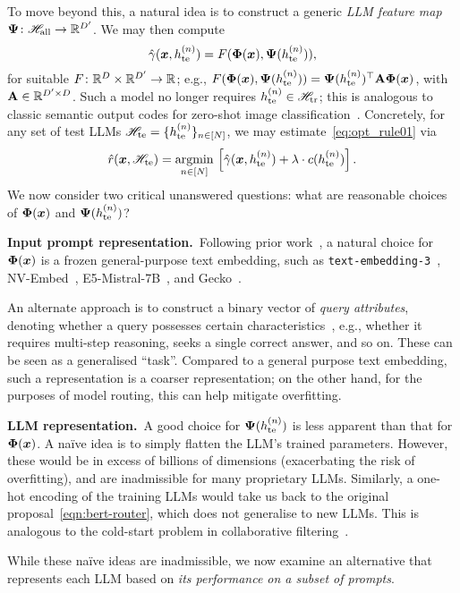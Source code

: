 To move beyond this, a natural idea is to 
construct a generic \emph{LLM feature map}
$\boldsymbol{\Psi} \colon \mathscr{H}_{\rm all} \to \mathbb{R}^{D'}$.
We may then compute
$$ \hat{\gamma}( \boldsymbol{x}, h_{\mathrm{te}}^{( n )} ) = F( \boldsymbol{\Phi}( \boldsymbol{x} ), \boldsymbol{\Psi}( h_{\mathrm{te}}^{( n )} ) ), $$
for suitable $F \colon \mathbb{R}^{D} \times \mathbb{R}^{D'} \to \mathbb{R}$;
e.g.,
$F( \boldsymbol{\Phi}( \boldsymbol{x} ), \boldsymbol{\Psi}( h_{\mathrm{te}}^{( n )} ) ) = \boldsymbol{\Psi}( h_{\mathrm{te}}^{( n )} )^\top \mathbf{A} \boldsymbol{\Phi}( \boldsymbol{x} )$,
with $\mathbf{A} \in \mathbb{R}^{D' \times D}$.
Such a model 
no longer requires $h_{\mathrm{te}}^{( n )} \in \mathscr{H}_{\text{tr}}$;
this is analogous to classic semantic output codes for zero-shot image classification~\citep{Palatucci:2009}.
Concretely, for any set of test LLMs $\mathscr{H}_{\mathrm{te}} = \{ h_{\mathrm{te}}^{(n)} \}_{n \in [ N ]}$,
we may estimate~\eqref{eq:opt_rule01} via
$$ \hat{r}(\boldsymbol{x}, \mathscr{H}_{\mathrm{te}}) = 
\underset{n \in [ N ]}{\operatorname{argmin}} \, \left[ \hat{\gamma}( \boldsymbol{x}, h_{\mathrm{te}}^{(n)} ) +\lambda\cdot c( h_{\mathrm{te}}^{(n)} ) \right]. $$
We now consider
two 
critical 
unanswered
questions:
what are reasonable choices of 
$\boldsymbol{\Phi}( \boldsymbol{x} )$ and
$\boldsymbol{\Psi}( h_{\mathrm{te}}^{( n )} )$? 


\textbf{Input prompt representation.}\ 
Following prior work~\citep{HuBieLi2024},
a natural choice 
for $\boldsymbol{\Phi}( \boldsymbol{x} )$
is a frozen general-purpose text embedding,
such as 
\texttt{text-embedding-3}~\citep{OpenAI:2025},
NV-Embed~\citep{Lee:2025},
E5-Mistral-7B~\citep{Wang:2024},
and
Gecko~\citep{LeeDaiRen2024}.

An alternate approach is to construct 
a binary vector of \emph{query attributes},
denoting whether a query possesses certain characteristics~\citep{Li:2024c,Li:2024d},
e.g.,
whether it 
requires multi-step reasoning,
seeks a single correct answer,
and so on.
These can be seen as a generalised 
``task''.
Compared to a general purpose text embedding,
such a representation is a coarser representation;
on the other hand,
for the purposes of model routing,
this can help mitigate overfitting.

\textbf{LLM representation.}\ 
A good choice for $\boldsymbol{\Psi}( h_{\mathrm{te}}^{( n )} )$ is less apparent than that for $\boldsymbol{\Phi}( \boldsymbol{x} )$.
A na\"{i}ve idea 
is to simply flatten the LLM's trained parameters.
However,
these would be in excess of billions of dimensions 
(exacerbating the risk of overfitting),
and 
are inadmissible for many proprietary LLMs.
Similarly,
a one-hot encoding of the training LLMs
would take us back to the original proposal~\eqref{eqn:bert-router},
which does not generalise to new LLMs.
This is analogous to the cold-start problem in collaborative filtering~\citep{Schein:2002}.

While these na\"{i}ve ideas are inadmissible, 
we now examine an alternative that represents each LLM based on \emph{its performance on a subset of prompts}.


